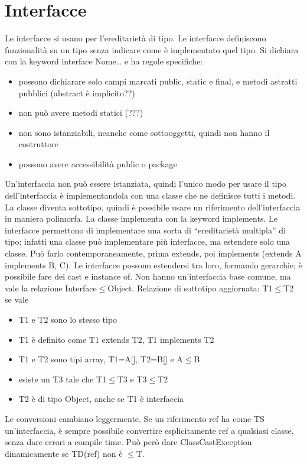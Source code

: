 \section{Interfacce}
Le interfacce si usano per l'ereditarietà di tipo. Le interfacce definiscono funzionalità su un tipo senza indicare come è implementato quel tipo. Si dichiara con la keyword interface Nome{…} e ha regole specifiche:
\begin{itemize}
\item possono dichiarare solo campi marcati public, static e final, e metodi astratti pubblici (abstract è implicito??)
\item non può avere metodi statici (???)
\item non sono istanziabili, neanche come sottooggetti, quindi non hanno il costruttore
\item possono avere accessibilità public o package
\end{itemize}
Un'interfaccia non può essere istanziata, quindi l'unico modo per usare il tipo dell'interfaccia è implementandola con una classe che ne definisce tutti i metodi. La classe diventa sottotipo, quindi è possibile usare un riferimento dell'interfaccia in maniera polimorfa. La classe implementa con la keyword implements. 
Le interfacce permettono di implementare una sorta di “ereditarietà multipla” di tipo; infatti una classe può implementare più interfacce, ma estendere solo una classe. Può farlo contemporaneamente, prima extends, poi implements (extends A implements B, C).
Le interfacce possono estendersi tra loro, formando gerarchie; è possibile fare dei cast e instance of. Non hanno un'interfaccia base comune, ma vale la relazione Interface$\le$Object.
Relazione di sottotipo aggiornata: T1$\le$T2 se vale
\begin{itemize}
\item T1 e T2 sono lo stesso tipo
\item T1 è definito come T1 extends T2, T1 implements T2
\item T1 e T2 sono tipi array, T1=A[], T2=B[] e A$\le$B
\item esiste un T3 tale che T1$\le$T3 e T3$\le$T2
\item T2 è di tipo Object, anche se T1 è interfaccia
\end{itemize}
Le conversioni cambiano leggermente. Se un riferimento ref ha come TS un'interfaccia, è sempre possibile convertire esplicitamente ref a qualsiasi classe, senza dare errori a compile time. Può però dare ClassCastException dinamicamente se TD(ref) non è $\le$T.

